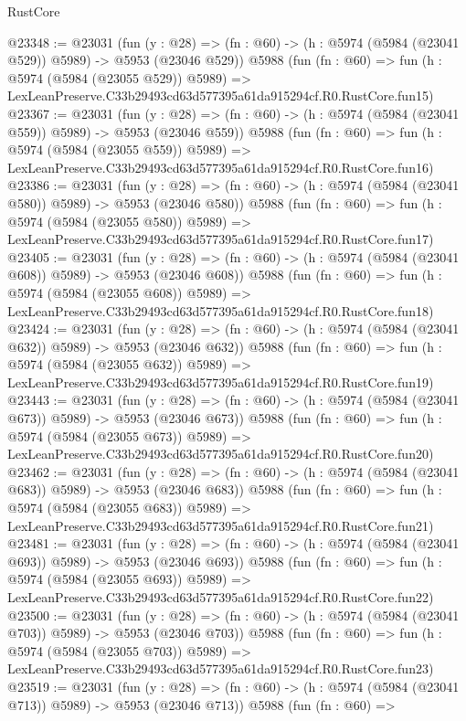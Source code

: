 \begin{lexlean}{RustCore}
\begin{coremodule}
@23348 := @23031
    (fun (y : @28) => (fn : @60) -> (h : @5974 (@5984 (@23041 @529)) @5989) -> @5953 (@23046 @529))
    @5988
    (fun (fn : @60) =>
    fun (h : @5974 (@5984 (@23055 @529)) @5989) =>
    LexLeanPreserve.C33b29493cd63d577395a61da915294cf.R0.RustCore.fun15)
@23367 := @23031
    (fun (y : @28) => (fn : @60) -> (h : @5974 (@5984 (@23041 @559)) @5989) -> @5953 (@23046 @559))
    @5988
    (fun (fn : @60) =>
    fun (h : @5974 (@5984 (@23055 @559)) @5989) =>
    LexLeanPreserve.C33b29493cd63d577395a61da915294cf.R0.RustCore.fun16)
@23386 := @23031
    (fun (y : @28) => (fn : @60) -> (h : @5974 (@5984 (@23041 @580)) @5989) -> @5953 (@23046 @580))
    @5988
    (fun (fn : @60) =>
    fun (h : @5974 (@5984 (@23055 @580)) @5989) =>
    LexLeanPreserve.C33b29493cd63d577395a61da915294cf.R0.RustCore.fun17)
@23405 := @23031
    (fun (y : @28) => (fn : @60) -> (h : @5974 (@5984 (@23041 @608)) @5989) -> @5953 (@23046 @608))
    @5988
    (fun (fn : @60) =>
    fun (h : @5974 (@5984 (@23055 @608)) @5989) =>
    LexLeanPreserve.C33b29493cd63d577395a61da915294cf.R0.RustCore.fun18)
@23424 := @23031
    (fun (y : @28) => (fn : @60) -> (h : @5974 (@5984 (@23041 @632)) @5989) -> @5953 (@23046 @632))
    @5988
    (fun (fn : @60) =>
    fun (h : @5974 (@5984 (@23055 @632)) @5989) =>
    LexLeanPreserve.C33b29493cd63d577395a61da915294cf.R0.RustCore.fun19)
@23443 := @23031
    (fun (y : @28) => (fn : @60) -> (h : @5974 (@5984 (@23041 @673)) @5989) -> @5953 (@23046 @673))
    @5988
    (fun (fn : @60) =>
    fun (h : @5974 (@5984 (@23055 @673)) @5989) =>
    LexLeanPreserve.C33b29493cd63d577395a61da915294cf.R0.RustCore.fun20)
@23462 := @23031
    (fun (y : @28) => (fn : @60) -> (h : @5974 (@5984 (@23041 @683)) @5989) -> @5953 (@23046 @683))
    @5988
    (fun (fn : @60) =>
    fun (h : @5974 (@5984 (@23055 @683)) @5989) =>
    LexLeanPreserve.C33b29493cd63d577395a61da915294cf.R0.RustCore.fun21)
@23481 := @23031
    (fun (y : @28) => (fn : @60) -> (h : @5974 (@5984 (@23041 @693)) @5989) -> @5953 (@23046 @693))
    @5988
    (fun (fn : @60) =>
    fun (h : @5974 (@5984 (@23055 @693)) @5989) =>
    LexLeanPreserve.C33b29493cd63d577395a61da915294cf.R0.RustCore.fun22)
@23500 := @23031
    (fun (y : @28) => (fn : @60) -> (h : @5974 (@5984 (@23041 @703)) @5989) -> @5953 (@23046 @703))
    @5988
    (fun (fn : @60) =>
    fun (h : @5974 (@5984 (@23055 @703)) @5989) =>
    LexLeanPreserve.C33b29493cd63d577395a61da915294cf.R0.RustCore.fun23)
@23519 := @23031
    (fun (y : @28) => (fn : @60) -> (h : @5974 (@5984 (@23041 @713)) @5989) -> @5953 (@23046 @713))
    @5988
    (fun (fn : @60) =>

\end{coremodule}
\end{lexlean}

